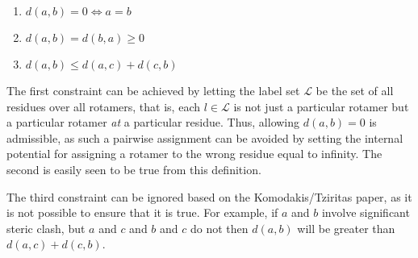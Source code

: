 \documentclass[11pt]{article}
\begin{document}
	\begin{enumerate}
		\item $d(a,b) = 0 \iff a=b$
		\item $d(a,b) = d(b,a) \geq 0$
		\item $d(a,b) \leq d(a,c) + d(c,b)$
	\end{enumerate} 
	
	The first constraint can be achieved by letting the label set $\mathcal{L}$
	be the set of all residues over all rotamers, that is, each $l \in \mathcal{L}$
	is not just a particular rotamer but a particular rotamer \textit{at} a 
	particular residue. Thus, allowing $d(a,b) = 0$ is admissible, as such a
	pairwise assignment can be avoided by setting the internal potential for 
	assigning a rotamer to the wrong residue equal to infinity. The second is
	easily seen to be true from this definition. 
		
	The third constraint can be ignored based on the Komodakis/Tziritas paper, as
	it is not possible to ensure that it is true. For example, if $a$ and $b$ 
	involve significant steric clash, but $a$ and $c$ and $b$ and $c$ do not
	then $d(a,b)$ will be greater than $d(a,c) + d(c,b)$.   
	
	 
\end{document}
